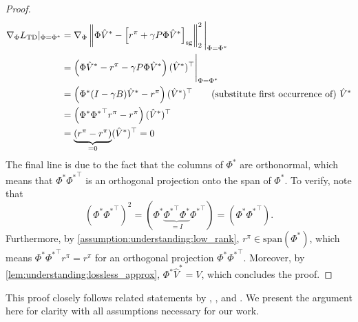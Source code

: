 \begin{proof}
    \begin{align*}
        \nabla_\Phi L_\text{TD}|_{\Phi = \Phi^*} & =  \nabla_{\Phi} \left\lVert \Phi \hat{V}^* - \left[r^\pi + \gamma P\Phi \hat{V}^*\right]_\text{sg} \right\rVert_2^2\Bigg|_{\Phi = \Phi^*}\\
        & = \left(\Phi \hat{V}^* - r^\pi - \gamma P\Phi {\hat{V}}^*\right) (\hat{V}^*)^\top\Bigg|_{\Phi = \Phi^*} \\
        & = \left(\Phi^* (I - \gamma B) {\hat{V}}^* - r^\pi \right)(\hat{V}^*)^\top \quad\quad \text{(substitute first occurrence of)~$\hat{V}^*$}\\
        & = \left(\Phi^* {\Phi^*}^\top r^\pi - r^\pi \right)({\hat{V}}^*)^\top\\
        & = \underbrace{\left(r^\pi - r^\pi \right)}_{=0}({\hat{V}}^*)^\top = 0
    \end{align*}
    The final line is due to the fact that the columns of $\Phi^*$ are orthonormal, which means that $\Phi^*{\Phi^*}^\top$ is an orthogonal projection onto the span of $\Phi^*$. To verify, note that $$\left(\Phi^*{\Phi^*}^\top\right)^2 = \left(\Phi^* \underbrace{{\Phi^*}^\top \Phi^*}_{=I}{\Phi^*}^\top\right) = \left(\Phi^*{\Phi^*}^\top\right).$$ Furthermore, by \autoref{assumption:understanding:low_rank}, $r^\pi \in \text{span}(\Phi^*)$, which means $\Phi^*{\Phi^*}^\top r^\pi = r^\pi$ for an orthogonal projection $\Phi^*{\Phi^*}^\top$.
    Moreover, by \autoref{lem:understanding:lossless_approx}, $\Phi^* \hat{V}^* = V$, which concludes the proof.
\end{proof}

This proof closely follows related statements by \cite{ghosh2020representations}, \cite{tang2022understanding}, and \cite{lelan2022generalization}. 
We present the argument here for clarity with all assumptions necessary for our work.


